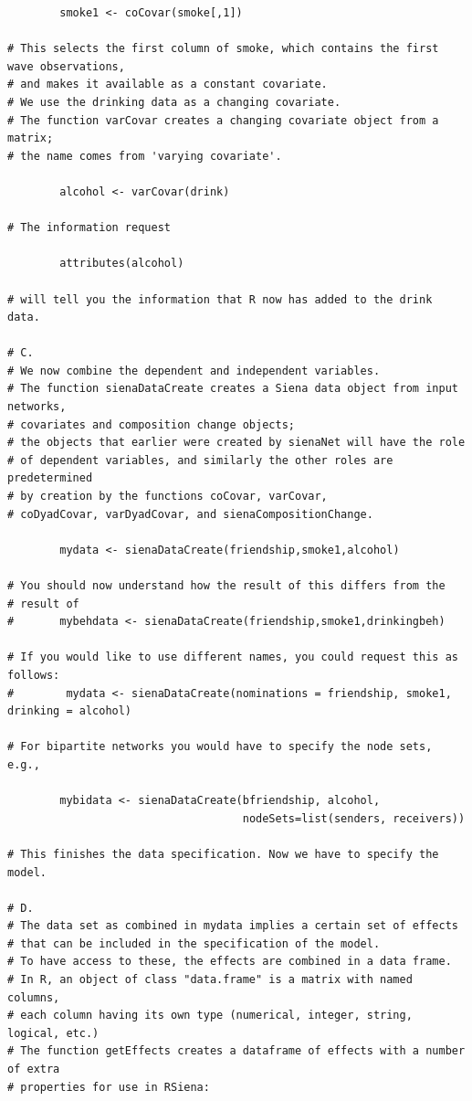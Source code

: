 \documentclass[a4paper,fleqn]{article}
\newcommand{\+}{\, + \,}
\begin{document}
{\begin{verbatim}
        smoke1 <- coCovar(smoke[,1])

# This selects the first column of smoke, which contains the first wave observations,
# and makes it available as a constant covariate.
# We use the drinking data as a changing covariate.
# The function varCovar creates a changing covariate object from a matrix;
# the name comes from 'varying covariate'.

        alcohol <- varCovar(drink)

# The information request

        attributes(alcohol)

# will tell you the information that R now has added to the drink data.

# C.
# We now combine the dependent and independent variables.
# The function sienaDataCreate creates a Siena data object from input networks,
# covariates and composition change objects;
# the objects that earlier were created by sienaNet will have the role
# of dependent variables, and similarly the other roles are predetermined
# by creation by the functions coCovar, varCovar,
# coDyadCovar, varDyadCovar, and sienaCompositionChange.

        mydata <- sienaDataCreate(friendship,smoke1,alcohol)

# You should now understand how the result of this differs from the
# result of
#       mybehdata <- sienaDataCreate(friendship,smoke1,drinkingbeh)

# If you would like to use different names, you could request this as follows:
#        mydata <- sienaDataCreate(nominations = friendship, smoke1, drinking = alcohol)

# For bipartite networks you would have to specify the node sets, e.g.,

        mybidata <- sienaDataCreate(bfriendship, alcohol,
                                    nodeSets=list(senders, receivers))

# This finishes the data specification. Now we have to specify the model.

# D.
# The data set as combined in mydata implies a certain set of effects
# that can be included in the specification of the model.
# To have access to these, the effects are combined in a data frame.
# In R, an object of class "data.frame" is a matrix with named columns,
# each column having its own type (numerical, integer, string, logical, etc.)
# The function getEffects creates a dataframe of effects with a number of extra
# properties for use in RSiena:


\end{verbatim}}
\end{document}
